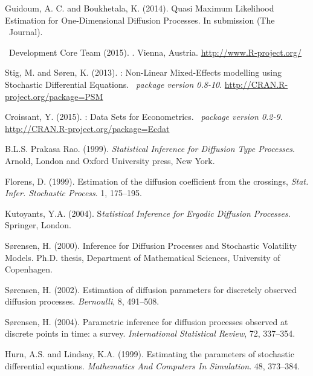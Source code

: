\begin{thebibliography}{1}
Guidoum, A. C. and Boukhetala, K. (2014).
\newblock Quasi Maximum Likelihood Estimation for One-Dimensional Diffusion Processes.
\newblock In submission (The \R~Journal).

\R~Development Core Team (2015).
.
\newblock Vienna, Austria.
\newblock \url{http://www.R-project.org/}

Stig, M. and S{\o}ren, K. (2013).
\newblock {}: Non-Linear Mixed-Effects modelling using Stochastic Differential Equations.
\newblock \emph{\R~package version 0.8-10}.
\newblock \url{http://CRAN.R-project.org/package=PSM}

Croissant, Y. (2015).
\newblock {}: Data Sets for Econometrics.
\newblock \emph{\R~package version 0.2-9}.
\newblock \url{http://CRAN.R-project.org/package=Ecdat}

B.L.S. Prakasa Rao. (1999).
\newblock \emph{Statistical Inference for Diffusion Type Processes}.
\newblock Arnold, London and Oxford University press, New York.

Florens, D. (1999).
\newblock Estimation of the diffusion coefficient from the crossings,
\newblock \emph{Stat. Infer. Stochastic Process}. 1, 175--195.

Kutoyants, Y.A. (2004).
\newblock S\emph{tatistical Inference for Ergodic Diffusion Processes}.
\newblock Springer, London.

S{\o}rensen, H. (2000).
\newblock Inference for Diffusion Processes and Stochastic Volatility Models.
\newblock Ph.D. thesis, Department of Mathematical Sciences, University of Copenhagen.

S{\o}rensen, H. (2002).
\newblock Estimation of diffusion parameters for discretely observed diffusion processes.
\newblock \emph{Bernoulli}, 8, 491--508.

S{\o}rensen, H. (2004).
\newblock Parametric inference for diffusion processes observed at discrete points in time: a survey.
\newblock \emph{International Statistical Review}, 72, 337--354.

Hurn, A.S. and Lindsay, K.A. (1999).
\newblock Estimating the parameters of stochastic differential equations.
\newblock \emph{Mathematics And Computers In Simulation}. 48, 373--384.


\end{thebibliography}
